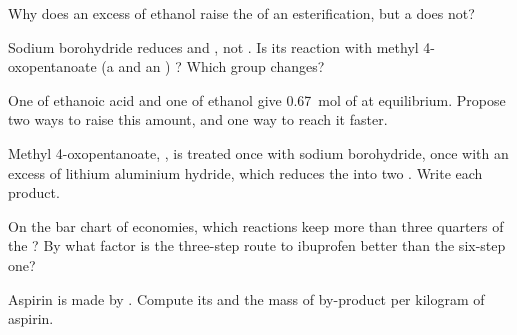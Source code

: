 \begin{exercise}[$\star$]\label{exo:g12:synthesis-strategy:4}
Why does an excess of ethanol raise the  of an esterification, but
a  does not?
\end{exercise}

\begin{exercise}[$\star$]\label{exo:g12:synthesis-strategy:5}
Sodium borohydride reduces  and , not . Is its
reaction with methyl 4-oxopentanoate (a  and an )
? Which group changes?
\end{exercise}

\begin{exercise}[$\star\star$]\label{exo:g12:synthesis-strategy:6}
One  of ethanoic acid and one of ethanol give \qty{0.67}{mol} of
 at equilibrium. Propose two ways to raise this amount, and one way
to reach it faster.
\end{exercise}

\begin{exercise}[$\star\star$]\label{exo:g12:synthesis-strategy:7}
Methyl 4-oxopentanoate, , is treated once
with sodium borohydride, once with an excess of lithium aluminium
hydride, which reduces the  into two . Write each product.
\end{exercise}

\begin{exercise}[$\star\star$]\label{exo:g12:synthesis-strategy:8}
On the bar chart of  economies, which reactions keep more than three
quarters of the ? By what factor is the three-step route to
ibuprofen better than the six-step one?
\end{exercise}

\begin{exercise}[$\star\star$]\label{exo:g12:synthesis-strategy:9}
Aspirin is made by . Compute its
 and the mass of by-product per kilogram of aspirin.
\end{exercise}


